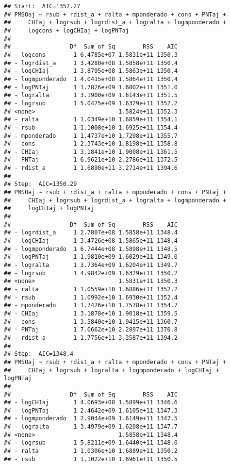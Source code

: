 \documentclass[
]{article}
\begin{document}
\begin{verbatim}
## Start:  AIC=1352.27
## PMSOaj ~ rsub + rdist_a + ralta + mponderado + cons + PNTaj + 
##     CHIaj + logrsub + logrdist_a + logralta + logmponderado + 
##     logcons + logCHIaj + logPNTaj
## 
##                 Df  Sum of Sq        RSS    AIC
## - logcons        1 6.4785e+07 1.5831e+11 1350.3
## - logrdist_a     1 3.4280e+08 1.5858e+11 1350.4
## - logCHIaj       1 3.8795e+08 1.5863e+11 1350.4
## - logmponderado  1 4.0415e+08 1.5864e+11 1350.4
## - logPNTaj       1 1.7826e+09 1.6002e+11 1351.0
## - logralta       1 3.1900e+09 1.6143e+11 1351.5
## - logrsub        1 5.0475e+09 1.6329e+11 1352.2
## <none>                        1.5824e+11 1352.3
## - ralta          1 1.0349e+10 1.6859e+11 1354.1
## - rsub           1 1.1008e+10 1.6925e+11 1354.4
## - mponderado     1 1.4737e+10 1.7298e+11 1355.7
## - cons           1 2.3743e+10 1.8198e+11 1358.8
## - CHIaj          1 3.1841e+10 1.9008e+11 1361.5
## - PNTaj          1 6.9621e+10 2.2786e+11 1372.5
## - rdist_a        1 1.6890e+11 3.2714e+11 1394.6
## 
## Step:  AIC=1350.29
## PMSOaj ~ rsub + rdist_a + ralta + mponderado + cons + PNTaj + 
##     CHIaj + logrsub + logrdist_a + logralta + logmponderado + 
##     logCHIaj + logPNTaj
## 
##                 Df  Sum of Sq        RSS    AIC
## - logrdist_a     1 2.7807e+08 1.5858e+11 1348.4
## - logCHIaj       1 3.4726e+08 1.5865e+11 1348.4
## - logmponderado  1 6.7444e+08 1.5898e+11 1348.5
## - logPNTaj       1 1.9810e+09 1.6029e+11 1349.0
## - logralta       1 3.7364e+09 1.6204e+11 1349.7
## - logrsub        1 4.9842e+09 1.6329e+11 1350.2
## <none>                        1.5831e+11 1350.3
## - ralta          1 1.0559e+10 1.6886e+11 1352.2
## - rsub           1 1.0992e+10 1.6930e+11 1352.4
## - mponderado     1 1.7476e+10 1.7578e+11 1354.7
## - CHIaj          1 3.1878e+10 1.9018e+11 1359.5
## - cons           1 3.5840e+10 1.9415e+11 1360.7
## - PNTaj          1 7.0662e+10 2.2897e+11 1370.8
## - rdist_a        1 1.7756e+11 3.3587e+11 1394.2
## 
## Step:  AIC=1348.4
## PMSOaj ~ rsub + rdist_a + ralta + mponderado + cons + PNTaj + 
##     CHIaj + logrsub + logralta + logmponderado + logCHIaj + logPNTaj
## 
##                 Df  Sum of Sq        RSS    AIC
## - logCHIaj       1 4.0693e+08 1.5899e+11 1346.6
## - logPNTaj       1 2.4642e+09 1.6105e+11 1347.3
## - logmponderado  1 2.9044e+09 1.6149e+11 1347.5
## - logralta       1 3.4979e+09 1.6208e+11 1347.7
## <none>                        1.5858e+11 1348.4
## - logrsub        1 5.8211e+09 1.6440e+11 1348.6
## - ralta          1 1.0306e+10 1.6889e+11 1350.2
## - rsub           1 1.1022e+10 1.6961e+11 1350.5

\end{verbatim}
\end{document}
